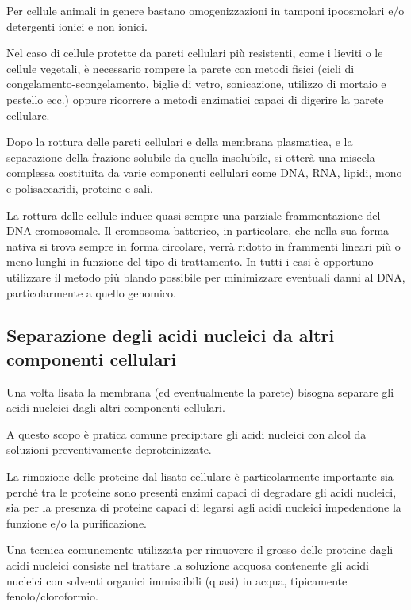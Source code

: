 \documentclass[11pt]{book}
\begin{document}
Per cellule animali in genere bastano omogenizzazioni in tamponi
ipoosmolari e/o detergenti ionici e non ionici.

Nel caso di cellule protette da pareti cellulari più resistenti, come i
lieviti o le cellule vegetali, è necessario rompere la parete con metodi
fisici (cicli di congelamento-scongelamento, biglie di vetro,
sonicazione, utilizzo di mortaio e pestello ecc.) oppure ricorrere a
metodi enzimatici capaci di digerire la parete cellulare.

Dopo la rottura delle pareti cellulari e della membrana plasmatica, e la
separazione della frazione solubile da quella insolubile, si otterà una
miscela complessa costituita da varie componenti cellulari come DNA,
RNA, lipidi, mono e polisaccaridi, proteine e sali.

La rottura delle cellule induce quasi sempre una parziale frammentazione
del DNA cromosomale. Il cromosoma batterico, in particolare, che nella
sua forma nativa si trova sempre in forma circolare, verrà ridotto in
frammenti lineari più o meno lunghi in funzione del tipo di trattamento.
In tutti i casi è opportuno utilizzare il metodo più blando possibile
per minimizzare eventuali danni al DNA, particolarmente a quello
genomico.

\subsection{Separazione degli acidi nucleici da altri componenti
cellulari}\label{separazione-degli-acidi-nucleici-da-altri-componenti-cellulari}

Una volta lisata la membrana (ed eventualmente la parete) bisogna
separare gli acidi nucleici dagli altri componenti cellulari.

A questo scopo è pratica comune precipitare gli acidi nucleici con alcol
da soluzioni preventivamente deproteinizzate.

La rimozione delle proteine dal lisato cellulare è particolarmente
importante sia perché tra le proteine sono presenti enzimi capaci di
degradare gli acidi nucleici, sia per la presenza di proteine capaci di
legarsi agli acidi nucleici impedendone la funzione e/o la
purificazione.

Una tecnica comunemente utilizzata per rimuovere il grosso delle
proteine dagli acidi nucleici consiste nel trattare la soluzione acquosa
contenente gli acidi nucleici con solventi organici immiscibili (quasi)
in acqua, tipicamente fenolo/cloroformio.
\end{document}
